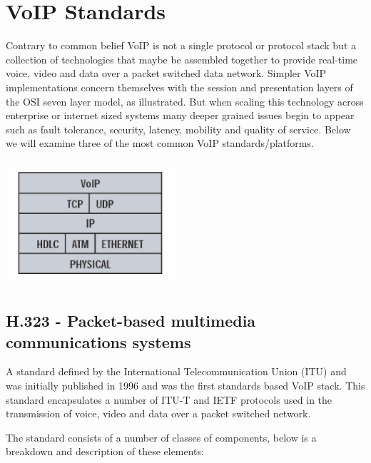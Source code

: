 \section{VoIP Standards}

Contrary to common belief VoIP is not a single protocol or protocol stack but a collection of technologies that maybe be assembled together to provide real-time voice, video and data over a packet switched data network. Simpler VoIP implementations concern themselves with the session and presentation layers of the OSI seven layer model, as illustrated. But when scaling this technology across enterprise or internet sized systems many deeper grained issues begin to appear such as fault tolerance, security, latency, mobility and quality of service. Below we will examine three of the most common VoIP standards/platforms.
\begin{center}
	\includegraphics[width=2.5in]{images/simple_voip_protocol.jpg}
\end{center}

\subsection{H.323 - Packet-based multimedia communications systems}
A standard defined by the International Telecommunication Union (ITU) and was initially published in 1996\cite{website:itu_h323} and was the first standards based VoIP stack\cite{website:packetizer_h323}. This standard encapsulates a number of ITU-T and IETF protocols used in the transmission of voice, video and data over a packet switched network.

The standard consists of a number of classes of components, below is a breakdown and description of these elements:

